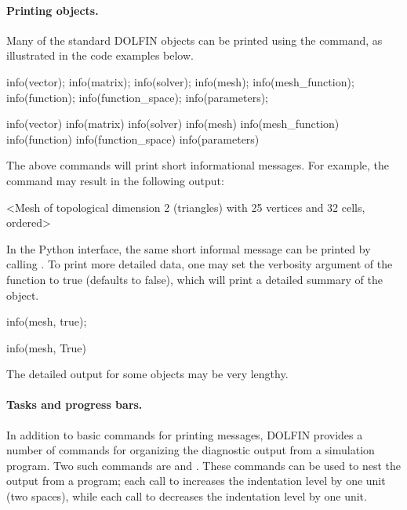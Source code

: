 \paragraph{Printing objects.}

Many of the standard DOLFIN objects can be printed using the 
command, as illustrated in the code examples below.
\begin{c++}
info(vector);
info(matrix);
info(solver);
info(mesh);
info(mesh_function);
info(function);
info(function_space);
info(parameters);
\end{c++}
\begin{python}
info(vector)
info(matrix)
info(solver)
info(mesh)
info(mesh_function)
info(function)
info(function_space)
info(parameters)
\end{python}
The above commands will print short informational messages. For example,
the command  may result in the following output:
\begin{gencode}
<Mesh of topological dimension 2 (triangles) with 25 vertices and 32 cells, ordered>
\end{gencode}
In the Python interface, the same short informal message can be printed
by calling . To print more detailed data, one may
set the verbosity argument of the  function to true (defaults
to false), which will print a detailed summary of the object.
\begin{c++}
info(mesh, true);
\end{c++}
\begin{python}
info(mesh, True)
\end{python}
The detailed output for some objects may be very lengthy.

\paragraph{Tasks and progress bars.}

In addition to basic commands for printing messages, DOLFIN provides a
number of commands for organizing the diagnostic output from a simulation
program. Two such commands are  and . These commands
can be used to nest the output from a program; each call to 
increases the indentation level by one unit (two spaces), while each
call to  decreases the indentation level by one unit.

